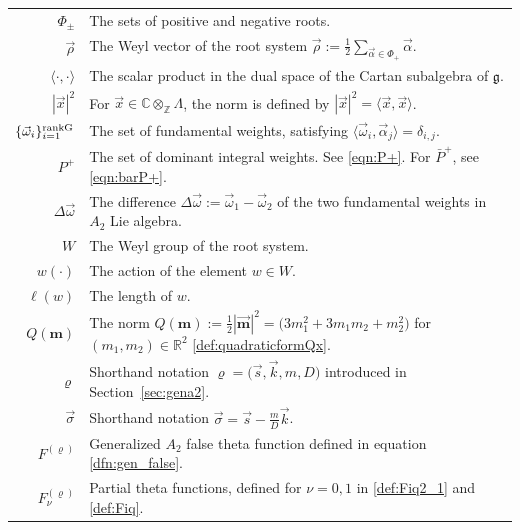 \documentclass[pdftex]{sigma}
\def\bos{\varrho}
\def\al{\alpha}
\theoremstyle{definition}
\numberwithin{equation}{section}
\begin{document}
\begin{table}[!ht]\renewcommand{\arraystretch}{1.3} \centering
	\begin{tabular}{r l}
		$\Phi_{\pm}$ & The sets of positive and negative roots.

\\		$\vec{\rho}$ & The Weyl vector of the root system $\vec{\rho}:=\frac{1}{2} \sum_{\vec{\al}\in\Phi_+} \vec{\al}$.
		\\
		$\langle \cdot,\cdot\rangle$ & The scalar product in the dual space of the Cartan subalgebra of $\mathfrak{g}$.
		\\
		$|\vec{x}|^2$ & For $\vec{x}\in\mathbb{C}\otimes_\mathbb{Z} \Lambda$, the norm is defined by $|\vec{x}|^2=\langle \vec{x},\vec{x}\rangle$.
		\\
		$\{\vec{\omega}_i\}_{i=1}^{\rm rankG}$ & The set of fundamental weights, satisfying $\langle \vec{\omega}_i,\vec{\alpha}_j \rangle = \delta_{i,j}$.
		\\
		$P^+$ & The set of dominant integral weights. See \eqref{eqn:P+}. For $\bar{P}^+$, see \eqref{eqn:barP+}.
		\\
		$\Delta \vec\omega$ &The difference $\Delta \vec\omega:= \vec\omega_1-\vec\omega_2$
		of the two fundamental weights in $A_2$ Lie algebra.
 		\\
		$W$ & The Weyl group of the root system.
		\\
		$w(\cdot )$ & The action of the element $w\in W$. \\ $\ell(w)$&
 The length of $w$.
		\\
		$Q(\mathbf{m})$ & The norm $ Q(\mathbf{m}):= \frac{1}{2}|\vec {\mathbf m}|^2= \bigl(3m_{1}^2+3m_1m_2+m_2^2\bigr)$ for $(m_1,m_2)\in {\mathbb R}^2$ \eqref{def:quadraticformQx}.\\
 $\bos$ & Shorthand notation $\bos = \bigl( \vec{s},\vec{k},m,D\bigr)$ introduced in Section~\ref{sec:gena2}.
		\\
		$\vec{\sigma}$ & Shorthand notation $\vec{\sigma}=\vec{s}-\tfrac{m}{D
 }\vec{k}$.
		\\
		$F^{(\bos)}$ & Generalized $A_2$ false theta function defined in equation \eqref{dfn:gen_false}.
		\\
		$F_\nu^{(\bos)}$ & Partial theta functions, defined for $\nu=0,1$ in \eqref{def:Fiq2_1} and \eqref{def:Fiq}. %
 \\

\end{tabular}
\end{table}
\end{document}
